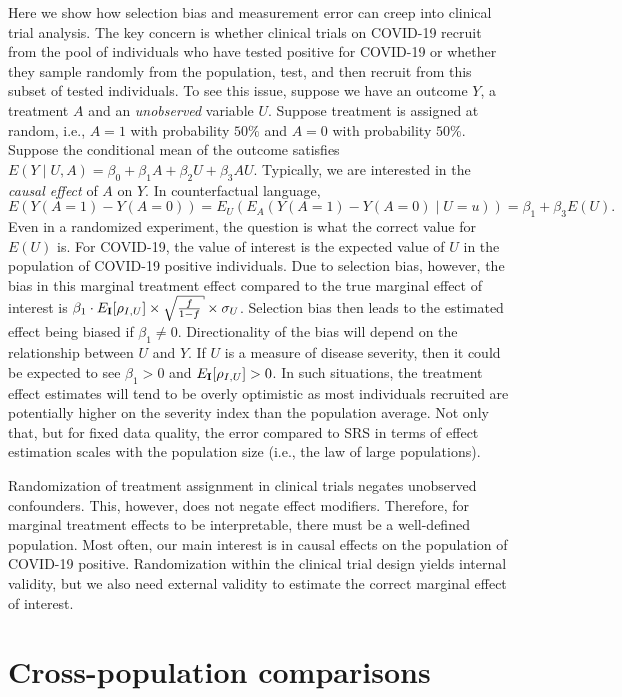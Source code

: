 \documentclass[aoas]{amsart}
\def\I{\bf I}
\begin{document}
Here we show how selection bias and measurement error can creep into clinical trial analysis. The key concern is whether clinical trials on COVID-19 recruit from the pool of individuals who have tested positive for COVID-19 or whether they sample randomly from the population, test, and then recruit from this subset of tested individuals.  To see this issue, suppose we have an outcome $Y$, a treatment $A$ and an \emph{unobserved} variable $U$.  Suppose treatment is assigned at random, i.e., $A =1$ with probability $50\%$ and $A=0$ with probability $50\%$.  Suppose the conditional mean of the outcome satisfies  $E(Y \mid U, A ) = \beta_0 + \beta_1 A + \beta_2 U + \beta_3 A U$.  Typically, we are interested in the \emph{causal effect} of $A$ on $Y$.  In counterfactual language,
$$
E( Y(A=1) - Y(A=0) ) = E_U ( E_A ( Y(A=1) - Y(A=0) \mid U=u ))
= \beta_1 + \beta_3 E(U).
$$
Even in a randomized experiment, the question is what the correct value for $E(U)$ is. For COVID-19, the value of interest is the expected value of $U$ in the population of COVID-19 positive individuals.  Due to selection bias, however, the bias in this marginal treatment effect compared to the true marginal effect of interest is $\beta_1 \cdot E_{\I} [ \rho_{I,U} ] \times \sqrt{ \frac{f}{1-f} } \times \sigma_U$.  Selection bias then leads to the estimated effect being biased if $\beta_1 \neq 0$.  Directionality of the bias will depend on the relationship between $U$ and $Y$.  If $U$ is a measure of disease severity, then it could be expected to see $\beta_1 > 0$ and $E_{\I} [ \rho_{I, U} ] >0$.  In such situations, the treatment effect estimates will tend to be overly optimistic as most individuals recruited are potentially higher on the severity index than the population average.  Not only that, but for fixed data quality, the error compared to SRS in terms of effect estimation scales with the population size (i.e., the law of large populations).

Randomization of treatment assignment in clinical trials negates unobserved confounders.  This, however, does not negate effect modifiers.  Therefore, for marginal treatment effects to be interpretable, there must be a well-defined population.  Most often, our main interest is in causal effects on the population of COVID-19 positive.  Randomization within the clinical trial design yields internal validity, but we also need external validity to estimate the correct marginal effect of interest.

\section{Cross-population comparisons}
\end{document}
